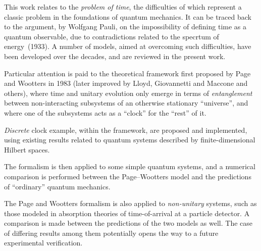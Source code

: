 This work relates to the
\emph{problem of time},
the difficulties of which
represent a classic problem in the foundations of quantum mechanics.
It can be traced back to
the argument, by Wolfgang Pauli,
on the impossibility of defining time as a quantum observable,
due to contradictions related to the specrtum of energy~(1933).
A number of models, aimed at overcoming such difficulties,
have been developed over the decades,
and are reviewed in the present work.

Particular attention is paid to 
the theoretical framework first proposed by Page and Wootters in 1983
(later improved by Lloyd, Giovannetti and Maccone and others),
where time and unitary evolution only emerge in
terms of \emph{entanglement} between non-interacting subsystems
of an otherwise stationary ``universe'',
and where one of the subsystems acts as a ``clock'' for the ``rest'' of it.

\emph{Discrete} clock example, within the framework, are proposed and implemented,
using
existing results related to quantum systems described by finite-dimensional Hilbert spaces.

The formalism is then applied to some simple quantum systems,
and a numerical comparison is performed between the Page--Wootters model and the predictions
of ``ordinary'' quantum mechanics.

The Page and Wootters formalism is also applied to \emph{non-unitary} systems,
such as those modeled in absorption theories of time-of-arrival at a particle detector.
A comparison is made between the predictions of the two models as well.
The case of differing results among them potentially opens the way to a future experimental verification.